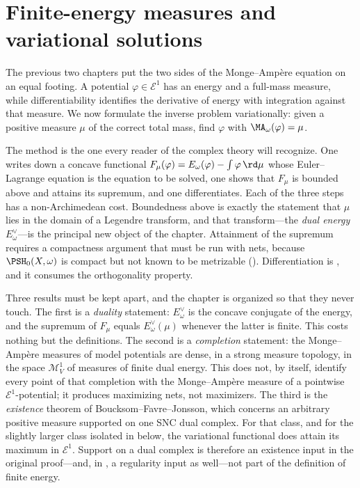 \chapter{Finite-energy measures and variational solutions}
\label{chap:bfj-finite-energy-measures}

The previous two chapters put the two sides of the Monge--Amp\`ere equation
on an equal footing.  A potential $\varphi\in\mathcal E^1$ has an energy
and a full-mass measure, while differentiability identifies the derivative of
energy with integration against that measure.  We now formulate the inverse
problem variationally: given a positive measure $\mu$ of the correct total
mass, find $\varphi$ with $\MA_\omega(\varphi)=\mu$.

The method is the one every reader of the complex theory will recognize.
One writes down a concave functional
$F_\mu(\varphi)=E_\omega(\varphi)-\int\varphi\,\rd\mu$ whose
Euler--Lagrange equation is the equation to be solved, one shows that
$F_\mu$ is bounded above and attains its supremum, and one differentiates.
Each of the three steps has a non-Archimedean cost.  Boundedness above is
exactly the statement that $\mu$ lies in the domain of a Legendre
transform, and that transform---the \emph{dual energy}
$E^\vee_\omega$---is the principal new object of the chapter.  Attainment
of the supremum requires a compactness argument that must be run with nets,
because $\PSH_0(X,\omega)$ is compact but not known to be metrizable
().  Differentiation is
, and it consumes the orthogonality property.

Three results must be kept apart, and the chapter is organized so that they
never touch.  The first is a \emph{duality} statement: $E^\vee_\omega$ is
the concave conjugate of the energy, and the supremum of $F_\mu$ equals
$E^\vee_\omega(\mu)$ whenever the latter is finite.  This costs nothing
but the definitions.  The second is a \emph{completion} statement: the
Monge--Amp\`ere measures of model potentials are dense, in a strong measure
topology, in the space $\mathcal M^1_V$ of measures of finite dual energy.
This does not, by itself, identify every point of that completion with the
Monge--Amp\`ere measure of a pointwise $\mathcal E^1$-potential; it
produces maximizing nets, not maximizers.  The third is the
\emph{existence} theorem of Boucksom--Favre--Jonsson, which concerns an
arbitrary positive measure supported on one SNC dual complex.  For that
class, and for the slightly larger class isolated in
 below, the variational functional does
attain its maximum in $\mathcal E^1$.  Support on a dual complex is
therefore an existence input in the original proof---and, in
, a regularity input as well---not part of the
definition of finite energy.

